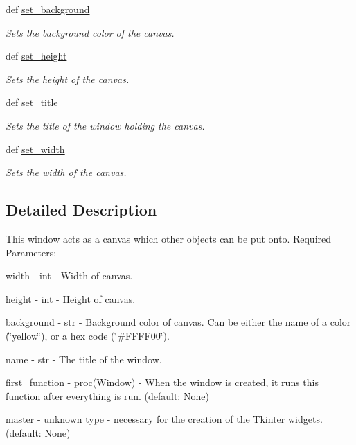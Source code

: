 \begin{DoxyCompactItemize}
\item 
def \hyperlink{classcs110graphics_1_1Window_a981a3115f1f22099549117313f38333c}{set\_\-background}
\begin{DoxyCompactList}\small\item\em Sets the background color of the canvas. \item\end{DoxyCompactList}\item 
def \hyperlink{classcs110graphics_1_1Window_a9b548549f8f09ca3f29e6e80483e21d2}{set\_\-height}
\begin{DoxyCompactList}\small\item\em Sets the height of the canvas. \item\end{DoxyCompactList}\item 
def \hyperlink{classcs110graphics_1_1Window_a227c806c2acbcaca9958ba3b610a85f6}{set\_\-title}
\begin{DoxyCompactList}\small\item\em Sets the title of the window holding the canvas. \item\end{DoxyCompactList}\item 
def \hyperlink{classcs110graphics_1_1Window_a55036373bfb4437eb4368a39fedb8722}{set\_\-width}
\begin{DoxyCompactList}\small\item\em Sets the width of the canvas. \item\end{DoxyCompactList}\end{DoxyCompactItemize}


\subsection{Detailed Description}
This window acts as a canvas which other objects can be put onto. Required Parameters:
\begin{DoxyItemize}
\item width -\/ int -\/ Width of canvas.
\item height -\/ int -\/ Height of canvas.
\item background -\/ str -\/ Background color of canvas. Can be either the name of a color (\char`\"{}yellow\char`\"{}), or a hex code (\char`\"{}\#FFFF00\char`\"{}).
\item name -\/ str -\/ The title of the window.
\item first\_\-function -\/ proc(Window) -\/ When the window is created, it runs this function after everything is run. (default: None)
\item master -\/ unknown type -\/ necessary for the creation of the Tkinter widgets. (default: None) 
\end{DoxyItemize}

